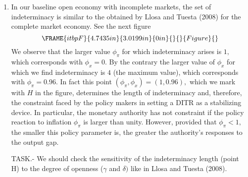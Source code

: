 \documentclass{article}
\begin{document}
\begin{enumerate}
\item In our baseline open economy with incomplete markets, the set of
indeterminacy is similar to the obtained by Llosa and Tuesta (2008) for the
complete market economy. See the next figure%
\begin{equation*}
\FRAME{itbpF}{4.7435in}{3.0199in}{0in}{}{}{Figure}{\special{language
"Scientific Word";type "GRAPHIC";maintain-aspect-ratio TRUE;display
"USEDEF";valid_file "T";width 4.7435in;height 3.0199in;depth
0in;original-width 11.7917in;original-height 7.4789in;cropleft "0";croptop
"1";cropright "1";cropbottom "0";tempfilename
'L37YPR02.wmf';tempfile-properties "XPR";}}
\end{equation*}%
We observe that the larger value $\phi _{\pi }$ for which indeterminacy
arises is $1,$ which corresponds with $\phi _{x}=0.$ By the contrary the
larger value of $\phi _{x}$ for which we find indeterminacy is $4$ (the
maximum value), which corresponds with $\phi _{\pi }=0.96.$ In fact this
point $\left( \phi _{\pi },\phi _{x}\right) =\left( 1,0.96\right) ,$ which
we mark with $H$ in the figure, determines the length of indeterminacy and,
therefore, the constraint faced by the policy makers in setting a DITR as a
stabilizing device. In particular, the monetary authority has not constraint
if the policy reaction to inflation $\phi _{\pi }$ is larger than unity.
However, provided that $\phi _{\pi }<1,$ the smaller this policy parameter
is, the greater the authority's responses to the output gap.

TASK.- We should check the sensitivity of the indeterminacy length (point H)
to the degree of openness ($\gamma $ and $\delta )$ like in Llosa and Tuesta
(2008).


\end{enumerate}
\end{document}
